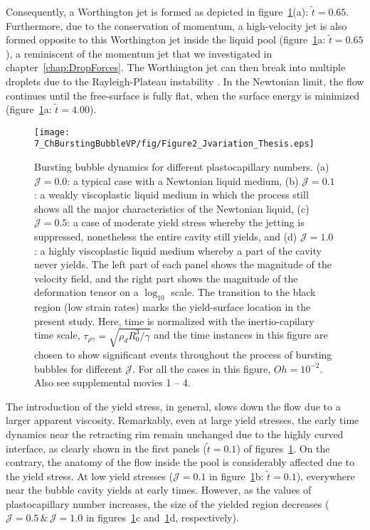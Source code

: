 Consequently, a Worthington jet is formed as depicted in figure~\ref{Ch7::fig:J_Variation}(a): $\tilde t = 0.65$. Furthermore, due to the conservation of momentum, a high-velocity jet is also formed opposite to this Worthington jet inside the liquid pool (figure~\ref{Ch7::fig:J_Variation}a: $\tilde t = 0.65$), a reminiscent of the momentum jet that we investigated in chapter~\ref{chap:DropForces}. The Worthington jet can then break into multiple droplets due to the Rayleigh-Plateau instability \citep{walls2015jet}. In the Newtonian limit, the flow continues until the free-surface is fully flat, when the surface energy is minimized (figure~\ref{Ch7::fig:J_Variation}a: $\tilde t = 4.00$).

\begin{figure}
	\centering
	\texttt{[image: 7\_ChBurstingBubbleVP/fig/Figure2\_Jvariation\_Thesis.eps]}
	\caption{Bursting bubble dynamics for different plastocapillary numbers. (a) $\mathcal{J} = 0.0$: a typical case with a Newtonian liquid medium, (b) $\mathcal{J} =0.1$: a weakly viscoplastic liquid medium in which the process still shows all the major characteristics of the Newtonian liquid, (c) $\mathcal{J} = 0.5$: a case of moderate yield stress whereby the jetting is suppressed, nonetheless the entire cavity still yields, and (d) $\mathcal{J} = 1.0$: a highly viscoplastic liquid medium whereby a part of the cavity never yields. The left part of each panel shows the magnitude of the velocity field, and the right part shows the magnitude of the deformation tensor on a $\log_{10}$ scale. The transition to the black region (low strain rates) marks the yield-surface location in the present study. Here, time is normalized with the inertio-capilary time scale, $\tau_{\rho\gamma} = \sqrt{\rho_d R_0^3/\gamma}$ and the time instances in this figure are chosen to show significant events throughout the process of bursting bubbles for different $\mathcal{J}$. For all the cases in this figure, $Oh = 10^{-2}$. Also see supplemental movies {\color{Myfig} 1 -- 4}.}
	\label{Ch7::fig:J_Variation}
\end{figure}

The introduction of the yield stress, in general, slows down the flow due to a larger apparent viscosity. Remarkably, even at large yield stresses, the early time dynamics near the retracting rim remain unchanged due to the highly curved interface, as clearly shown in the first panels ($\tilde t = 0.1$) of figures~\ref{Ch7::fig:J_Variation}.  
On the contrary, the anatomy of the flow inside the pool is considerably affected due to the yield stress. At low yield stresses ($\mathcal{J} = 0.1$ in figure~\ref{Ch7::fig:J_Variation}b: $\tilde t = 0.1$), everywhere near the bubble cavity yields at early times. However, as the values of plastocapillary number increases, the size of the yielded region decreases ($\mathcal{J} = 0.5\, \&\,\mathcal{J} = 1.0$ in figures~\ref{Ch7::fig:J_Variation}c and~\ref{Ch7::fig:J_Variation}d, respectively). 

